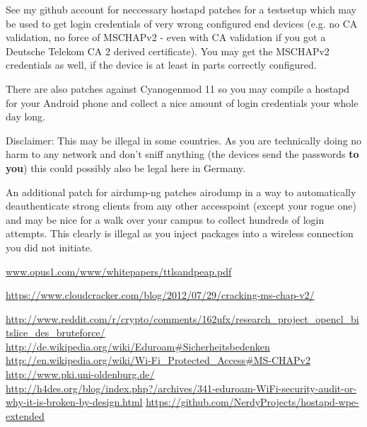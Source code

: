 \documentclass[12pt,a4paper]{scrartcl}
\begin{document}
See my github account \cite{gh-nerdy} for neccessary hostapd patches for a testsetup which may be used to get login credentials of very wrong configured end devices (e.g. no CA validation, no force of MSCHAPv2 - even with CA validation if you got a Deutsche Telekom CA 2 derived certificate).
You may get the MSCHAPv2 credentials as well, if the device is at least in parts correctly configured.

There are also patches against Cyanogenmod 11 so you may compile a hostapd for your Android phone and collect a nice amount of login credentials your whole day long.

Disclaimer: This may be illegal in some countries. As you are technically doing no harm to any network and don't sniff anything (the devices send the passwords \textbf{to you}) this could possibly also be legal here in Germany. 

An additional patch for airdump-ng patches airodump in a way to automatically deauthenticate strong clients from any other accesspoint (except your rogue one) and may be nice for a walk over your campus to collect hundreds of login attempts.
This clearly is illegal as you inject packages into a wireless connection you did not initiate.

\begin{thebibliography}{9}

  \url{www.opus1.com/www/whitepapers/ttlsandpeap.pdf}

  \url{https://www.cloudcracker.com/blog/2012/07/29/cracking-ms-chap-v2/}

  \url{http://www.reddit.com/r/crypto/comments/162ufx/research\_project\_opencl\_bitslice\_des\_bruteforce/}
  \url{http://de.wikipedia.org/wiki/Eduroam#Sicherheitsbedenken}
  \url{http://en.wikipedia.org/wiki/Wi-Fi_Protected_Access#MS-CHAPv2}
  \url{http://www.pki.uni-oldenburg.de/}
  \url{http://h4des.org/blog/index.php?/archives/341-eduroam-WiFi-security-audit-or-why-it-is-broken-by-design.html}
  \url{https://github.com/NerdyProjects/hostapd-wpe-extended}
\end{thebibliography}
\end{document}

